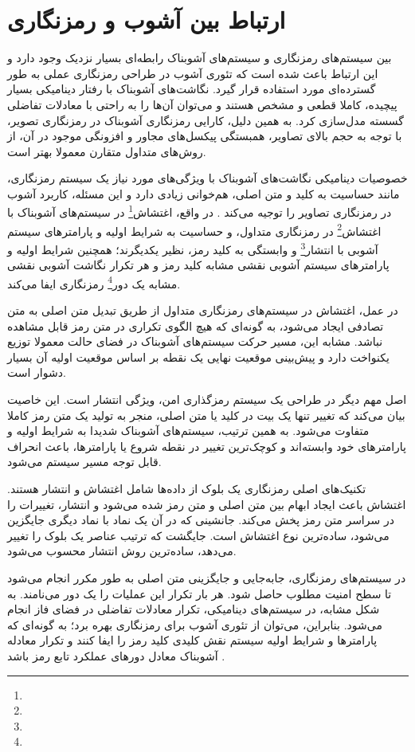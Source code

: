 \section{ارتباط بین آشوب و رمزنگاری}

بین سیستم‌های رمزنگاری و سیستم‌های آشوبناک رابطه‌ای بسیار نزدیک وجود دارد و این ارتباط باعث شده است که تئوری آشوب در طراحی رمزنگاری عملی به طور گسترده‌ای مورد استفاده قرار گیرد. نگاشت‌های آشوبناک با رفتار دینامیکی بسیار پیچیده، کاملا قطعی و مشخص هستند و می‌توان آن‌ها را به راحتی با معادلات تفاضلی گسسته مدل‌سازی کرد. به همین دلیل، کارایی رمزنگاری آشوبناک در رمزنگاری تصویر، با توجه به حجم بالای تصاویر، همبستگی پیکسل‌های مجاور و افزونگی موجود در آن، از روش‌های متداول متقارن معمولا بهتر است\cite{ref36}.

خصوصیات دینامیکی نگاشت‌های آشوبناک با ویژگی‌های مورد نیاز یک سیستم رمزنگاری، مانند حساسیت به کلید و متن اصلی، هم‌خوانی زیادی دارد و این مسئله، کاربرد آشوب در رمزنگاری تصاویر را توجیه می‌کند \cite{ref19}. در واقع، اغتشاش\footnote{} در سیستم‌های آشوبناک با اغتشاش\footnote{} در رمزنگاری متداول، و حساسیت به شرایط اولیه و پارامترهای سیستم آشوبی با انتشار\footnote{} و وابستگی به کلید رمز، نظیر یکدیگرند؛ همچنین شرایط اولیه و پارامترهای سیستم آشوبی نقشی مشابه کلید رمز و هر تکرار نگاشت آشوبی نقشی مشابه یک دور\footnote{} رمزنگاری ایفا می‌کند.

در عمل، اغتشاش در سیستم‌های رمزنگاری متداول از طریق تبدیل متن اصلی به متن تصادفی ایجاد می‌شود، به گونه‌ای که هیچ الگوی تکراری در متن رمز قابل مشاهده نباشد. مشابه این، مسیر حرکت سیستم‌های آشوبناک در فضای حالت معمولا توزیع یکنواخت دارد و پیش‌بینی موقعیت نهایی یک نقطه بر اساس موقعیت اولیه آن بسیار دشوار است\cite{ref23}.

اصل مهم دیگر در طراحی یک سیستم رمزگذاری امن، ویژگی انتشار است. این خاصیت بیان می‌کند که تغییر تنها یک بیت در کلید یا متن اصلی، منجر به تولید یک متن رمز کاملا متفاوت می‌شود. به همین ترتیب، سیستم‌های آشوبناک شدیدا به شرایط اولیه و پارامترهای خود وابسته‌اند و کوچک‌ترین تغییر در نقطه شروع یا پارامترها، باعث انحراف قابل توجه مسیر سیستم می‌شود\cite{ref23}.

تکنیک‌های اصلی رمزنگاری یک بلوک از داده‌ها شامل اغتشاش و انتشار هستند. اغتشاش باعث ایجاد ابهام بین متن اصلی و متن رمز شده می‌شود و انتشار، تغییرات را در سراسر متن رمز پخش می‌کند. جانشینی که در آن یک نماد با نماد دیگری جایگزین می‌شود، ساده‌ترین نوع اغتشاش است. جایگشت که ترتیب عناصر یک بلوک را تغییر می‌دهد، ساده‌ترین روش انتشار محسوب می‌شود.

در سیستم‌های رمزنگاری، جابه‌جایی و جایگزینی متن اصلی به طور مکرر انجام می‌شود تا سطح امنیت مطلوب حاصل شود. هر بار تکرار این عملیات را یک دور می‌نامند. به شکل مشابه، در سیستم‌های دینامیکی، تکرار معادلات تفاضلی در فضای فاز انجام می‌شود. بنابراین، می‌توان از تئوری آشوب برای رمزنگاری بهره برد؛ به گونه‌ای که پارامترها و شرایط اولیه سیستم نقش کلیدی کلید رمز را ایفا کنند و تکرار معادله آشوبناک معادل دورهای عملکرد تابع رمز باشد \cite{ref33}.

